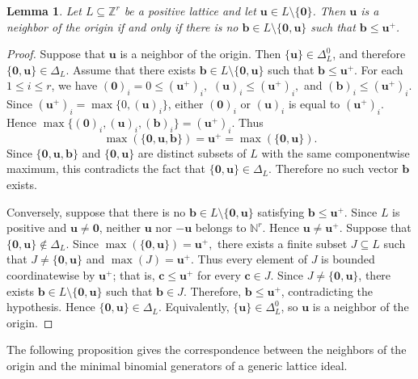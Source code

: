 \documentclass[12pt,a4paper]{amsart}
\newtheorem{lemma}[theorem]{Lemma}
\theoremstyle{definition}
\begin{document}
\begin{lemma}\label{lem:neighbor}
Let $L\subseteq\mathbb Z^r$ be a positive lattice and let
$\mathbf u\in L\setminus\{\mathbf0\}$.
Then $\mathbf u$ is a neighbor of the origin if and only if there is
no $\mathbf b\in L\setminus\{\mathbf0,\mathbf u\}$ such that
$\mathbf b\le\mathbf u^+$.
\end{lemma}
\begin{proof}
Suppose that $\mathbf u$ is a neighbor of the origin. Then
$\{\mathbf u\}\in\Delta_L^0$, and therefore
$\{\mathbf0,\mathbf u\}\in\Delta_L$. Assume that there exists
$\mathbf b\in L\setminus\{\mathbf0,\mathbf u\}$
such that
$\mathbf b\le\mathbf u^+$.
For each $1 \leq i \leq r$, we have
$
(\mathbf0)_i=0\le(\mathbf u^+)_i,$ 
$(\mathbf u)_i\le(\mathbf u^+)_i,$ and
$(\mathbf b)_i\le(\mathbf u^+)_i.$
Since
$(\mathbf u^+)_i=\max\{0,(\mathbf u)_i\}$, either $(\mathbf0)_i$ or $(\mathbf u)_i$ is equal to
$(\mathbf u^+)_i$. Hence $
\max\{(\mathbf0)_i,(\mathbf u)_i,(\mathbf b)_i\}
=
(\mathbf u^+)_i.$
Thus
\[
\max(\{\mathbf0,\mathbf u,\mathbf b\})
=
\mathbf u^+
=
\max(\{\mathbf0,\mathbf u\}).
\]
Since
$\{\mathbf0,\mathbf u,\mathbf b\}$ and
$\{\mathbf0,\mathbf u\}$
are distinct subsets of $L$ with the same componentwise maximum, this
contradicts the fact that
$\{\mathbf0,\mathbf u\}\in\Delta_L$.
Therefore no such vector $\mathbf b$ exists.

Conversely, suppose that there is no
$\mathbf b\in L\setminus\{\mathbf0,\mathbf u\}$
satisfying
$\mathbf b\le\mathbf u^+$.
Since $L$ is positive and $\mathbf u\neq\mathbf0$, neither
$\mathbf u$ nor $-\mathbf u$ belongs to $\mathbb N^r$.
Hence
$\mathbf u\neq\mathbf u^+$.
Suppose that
$\{\mathbf0,\mathbf u\}\notin\Delta_L$.
Since
$
\max(\{\mathbf0,\mathbf u\})
=
\mathbf u^+,$
there exists a finite subset
$J\subseteq L$
such that
$J\neq\{\mathbf0,\mathbf u\}$
and
$\max(J)=\mathbf u^+$. Thus every element of $J$ is bounded coordinatewise by
$\mathbf u^+$; that is,
$\mathbf c\le\mathbf u^+$ for every $\mathbf c\in J$.
Since
$J\neq\{\mathbf0,\mathbf u\}$,
there exists
$\mathbf b\in L\setminus\{\mathbf0,\mathbf u\}$
such that
$\mathbf b\in J$.
Therefore,
$\mathbf b\le\mathbf u^+$,
contradicting the hypothesis.
Hence
$\{\mathbf0,\mathbf u\}\in\Delta_L$.
Equivalently,
$\{\mathbf u\}\in\Delta_L^0$,
so $\mathbf u$ is a neighbor of the origin.
\end{proof}
The following proposition gives the correspondence between the
neighbors of the origin and the minimal binomial generators of a
generic lattice ideal.
\end{document}
